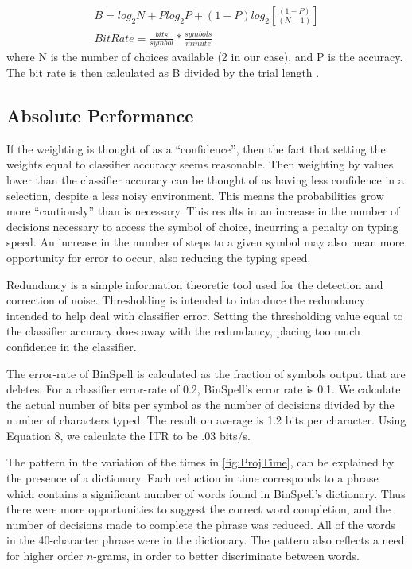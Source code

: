 \documentclass[12pt,titlepage]{article}
\begin{document}
\begin{gather*}
	B = log_2 N + P log_2P + (1-P)log_2[\frac{(1-P)}{(N-1)}]\tag{7}\\
	BitRate = \frac{bits}{symbol} * \frac{symbols}{minute}\tag{8}
\end{gather*}
where N is the number of choices available (2 in our case), and P is the accuracy.  The bit rate is then calculated as B divided by the trial length \cite{wolpaw_braincomputer_2002}\cite{mcfarland2003brain}\cite{kelly_visual_2005}.


\subsection{Absolute Performance}

If the weighting is thought of as a ``confidence'', then the fact that setting the weights equal to 
classifier accuracy seems reasonable.  Then weighting by values lower than the classifier 
accuracy can be thought of as having less confidence in a selection, despite a less noisy 
environment.  This means the probabilities grow more ``cautiously'' than is necessary.  This 
results in an increase in the number of decisions necessary to access the symbol of choice, 
incurring a penalty on typing speed.  An increase in the number of steps to a given symbol may 
also mean more opportunity for error to occur, also reducing the typing speed.

Redundancy is a simple information theoretic tool used for the detection and correction of noise.  Thresholding is intended to introduce the redundancy intended to help deal with classifier error.  Setting the thresholding value equal to the classifier accuracy does away with the redundancy, placing too much confidence in the classifier.

The error-rate of BinSpell is calculated as the fraction of symbols output that are deletes.  For a classifier error-rate of 0.2, BinSpell's error rate is 0.1.  We calculate the actual number of bits per symbol as the number of decisions divided by the number of characters typed.  The result on average is 1.2 bits per character.  Using Equation 8, we calculate the ITR to be .03 bits/s.  

The pattern in the variation of the times in \ref{fig:ProjTime}, can be explained by 
the presence of a dictionary.  Each reduction in time corresponds to a phrase 
which contains a significant number of words found in BinSpell's dictionary.  Thus there were 
more opportunities to suggest the correct word completion, and the number of decisions made 
to complete the phrase was reduced.  All of the words in the 40-character phrase were in the 
dictionary.  The pattern also reflects a need for higher order $n$-grams, in order to better 
discriminate between words.
\end{document}
